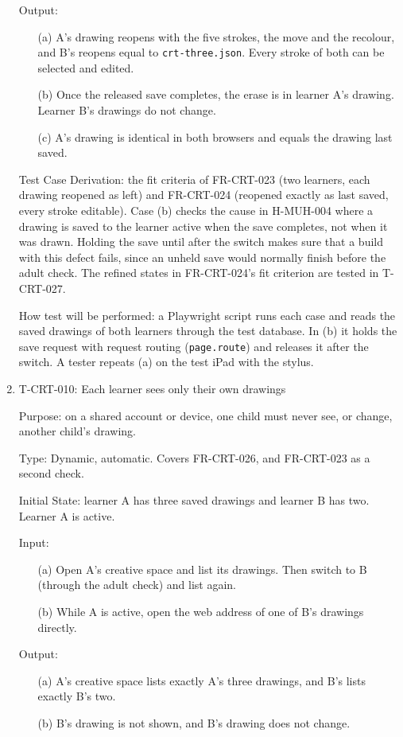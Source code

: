 \documentclass[12pt, titlepage]{article}
\newcommand{\testitem}[1]{\item #1\par\nopagebreak}
\begin{document}
\begin{enumerate}
Output:
\begin{itemize}
\item[(a)] A's drawing reopens with the five strokes, the move and the
recolour, and B's reopens equal to \texttt{crt-three.json}. Every stroke of
both can be selected and edited.
\item[(b)] Once the released save completes, the erase is in learner A's
drawing. Learner B's drawings do not change.
\item[(c)] A's drawing is identical in both browsers and equals the drawing
last saved.
\end{itemize}

Test Case Derivation: the fit criteria of FR-CRT-023 (two learners, each
drawing reopened as left) and FR-CRT-024 (reopened exactly as last saved,
every stroke editable). Case (b) checks the cause in H-MUH-004 where a
drawing is saved to the learner active when the save completes, not when it
was drawn. Holding the save until after the switch makes sure that a build
with this defect fails, since an unheld save would normally finish before the
adult check. The refined states in FR-CRT-024's fit criterion are tested in
T-CRT-027.

How test will be performed: a Playwright script runs each case and reads the
saved drawings of both learners through the test database. In (b) it holds
the save request with request routing (\texttt{page.route}) and releases it
after the switch. A tester repeats (a) on the test iPad with the stylus.

\testitem{T-CRT-010: Each learner sees only their own drawings}

Purpose: on a shared account or device, one child must never see, or change,
another child's drawing.

Type: Dynamic, automatic. Covers FR-CRT-026, and FR-CRT-023 as a second
check.

Initial State: learner A has three saved drawings and learner B has two.
Learner A is active.

Input:
\begin{itemize}
\item[(a)] Open A's creative space and list its drawings. Then switch to B
(through the adult check) and list again.
\item[(b)] While A is active, open the web address of one of B's drawings
directly.
\end{itemize}

Output:
\begin{itemize}
\item[(a)] A's creative space lists exactly A's three drawings, and B's lists
exactly B's two.
\item[(b)] B's drawing is not shown, and B's drawing does not change.
\end{itemize}


\end{enumerate}
\end{document}
